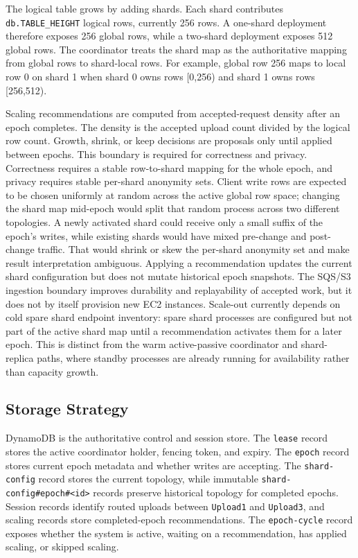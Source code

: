 \documentclass[conference]{IEEEtran}
\begin{document}
The logical table grows by adding shards. Each shard contributes \texttt{db.TABLE\_HEIGHT} logical rows, currently 256 rows. A one-shard deployment therefore exposes 256 global rows, while a two-shard deployment exposes 512 global rows. The coordinator treats the shard map as the authoritative mapping from global rows to shard-local rows. For example, global row 256 maps to local row 0 on shard 1 when shard 0 owns rows [0,256) and shard 1 owns rows [256,512).

Scaling recommendations are computed from accepted-request density after an epoch completes. The density is the accepted upload count divided by the logical row count. Growth, shrink, or keep decisions are proposals only until applied between epochs. This boundary is required for correctness and privacy. Correctness requires a stable row-to-shard mapping for the whole epoch, and privacy requires stable per-shard anonymity sets. Client write rows are expected to be chosen uniformly at random across the active global row space; changing the shard map mid-epoch would split that random process across two different topologies. A newly activated shard could receive only a small suffix of the epoch's writes, while existing shards would have mixed pre-change and post-change traffic. That would shrink or skew the per-shard anonymity set and make result interpretation ambiguous. Applying a recommendation updates the current shard configuration but does not mutate historical epoch snapshots. The SQS/S3 ingestion boundary improves durability and replayability of accepted work, but it does not by itself provision new EC2 instances. Scale-out currently depends on cold spare shard endpoint inventory: spare shard processes are configured but not part of the active shard map until a recommendation activates them for a later epoch. This is distinct from the warm active-passive coordinator and shard-replica paths, where standby processes are already running for availability rather than capacity growth.

\subsection{Storage Strategy}

DynamoDB is the authoritative control and session store. The \texttt{lease} record stores the active coordinator holder, fencing token, and expiry. The \texttt{epoch} record stores current epoch metadata and whether writes are accepting. The \texttt{shard-config} record stores the current topology, while immutable \texttt{shard-config\#epoch\#<id>} records preserve historical topology for completed epochs. Session records identify routed uploads between \texttt{Upload1} and \texttt{Upload3}, and scaling records store completed-epoch recommendations. The \texttt{epoch-cycle} record exposes whether the system is active, waiting on a recommendation, has applied scaling, or skipped scaling.
\end{document}
